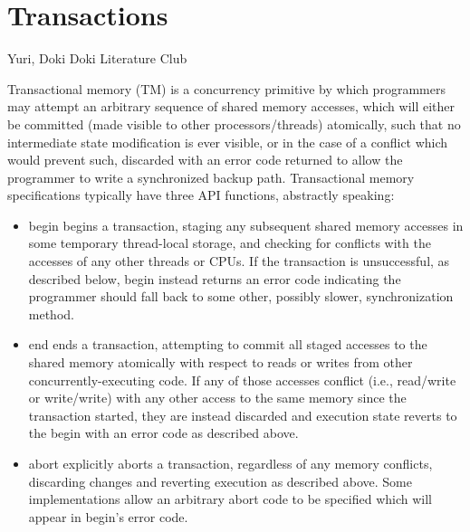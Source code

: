 \chapter{Transactions}
\label{chap:tm}


{Yuri, Doki Doki Literature Club}

Transactional memory (TM) is a concurrency primitive
by which programmers may attempt an arbitrary sequence of shared memory accesses,
which will either be committed (made visible to other processors/threads) atomically,
such that no intermediate state modification is ever visible,
or in the case of a conflict which would prevent such,
discarded with an error code returned to allow the programmer to write a synchronized backup path.
%
Transactional memory specifications typically have three API functions, abstractly speaking:
\begin{itemize}
	\item  {\sf begin} begins a transaction,
		staging any subsequent shared memory accesses in some temporary thread-local storage,
		and checking for conflicts with the accesses of any other threads or CPUs.
		If the transaction is unsuccessful, as described below,
		{\sf begin} instead returns an error code
		indicating the programmer should fall back to some other, possibly slower, synchronization method.
	\item {\sf end} ends a transaction,
		attempting to commit all staged accesses to the shared memory atomically with respect to
		reads or writes from other concurrently-executing code.
		If any of those accesses conflict (i.e., read/write or write/write)
		with any other access to the same memory since the transaction started,
		they are instead discarded and execution state reverts to the {\sf begin} with an error code as described above.
	\item {\sf abort} explicitly aborts a transaction,
		regardless of any memory conflicts,
		discarding changes and reverting execution as described above.
		Some implementations allow an arbitrary abort code to be specified
		which will appear in {\sf begin}'s error code.
\end{itemize}

